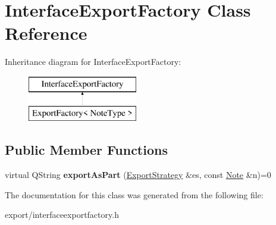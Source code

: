 \hypertarget{class_interface_export_factory}{\section{Interface\-Export\-Factory Class Reference}
\label{class_interface_export_factory}
}
Inheritance diagram for Interface\-Export\-Factory\-:\begin{figure}[H]
\begin{center}
\leavevmode
\includegraphics[height=2.000000cm]{class_interface_export_factory}
\end{center}
\end{figure}
\subsection*{Public Member Functions}
\begin{DoxyCompactItemize}
\item 
\hypertarget{class_interface_export_factory_a1d06f4f9a15c154bbe306bafb2c5029b}{virtual Q\-String {\bfseries export\-As\-Part} (\hyperlink{class_export_strategy}{Export\-Strategy} \&es, const \hyperlink{class_note}{Note} \&n)=0}\label{class_interface_export_factory_a1d06f4f9a15c154bbe306bafb2c5029b}

\end{DoxyCompactItemize}


The documentation for this class was generated from the following file\-:\begin{DoxyCompactItemize}
\item 
export/interfaceexportfactory.\-h\end{DoxyCompactItemize}
